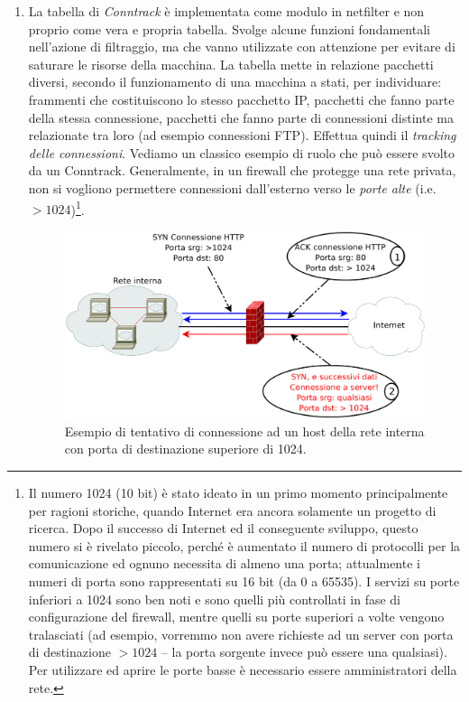 \begin{enumerate}
\item La tabella di \textit{Conntrack} è implementata come modulo in netfilter e non proprio come vera e propria tabella. Svolge alcune funzioni fondamentali nell'azione di filtraggio, ma che vanno utilizzate con attenzione per evitare di saturare le risorse della macchina. La tabella mette in relazione pacchetti diversi, secondo il funzionamento di una macchina a stati, per individuare: frammenti che costituiscono lo stesso pacchetto IP, pacchetti che fanno parte della stessa connessione, pacchetti che fanno parte di connessioni distinte ma relazionate tra loro (ad esempio connessioni FTP). Effettua quindi il \textit{tracking delle connessioni}. Vediamo un classico esempio di ruolo che può essere svolto da un Conntrack. Generalmente, in un firewall che protegge una rete privata, non si vogliono permettere connessioni dall'esterno verso le \textit{porte alte} (i.e. $>1024$)\footnote{Il numero 1024 (10 bit) è stato ideato in un primo momento principalmente per ragioni storiche, quando Internet era ancora solamente un progetto di ricerca. Dopo il successo di Internet ed il conseguente sviluppo, questo numero si è rivelato piccolo, perché è aumentato il numero di protocolli per la comunicazione ed ognuno necessita di almeno una porta; attualmente i numeri di porta sono rappresentati su 16 bit (da 0 a 65535). I servizi su porte inferiori a 1024 sono ben noti e sono quelli più controllati in fase di configurazione del firewall, mentre quelli su porte superiori a volte vengono tralasciati (ad esempio, vorremmo non avere richieste ad un server con porta di destinazione $>1024$ -- la porta sorgente invece può essere una qualsiasi). Per utilizzare ed aprire le porte basse è necessario essere amministratori della rete.}.
\begin{figure}[htbp]
	\centering
	\includegraphics[scale = 0.3]{images/conntrack-example}
	\caption{Esempio di tentativo di connessione ad un host della rete interna con porta di destinazione superiore di 1024.}

\end{figure}
\end{enumerate}
